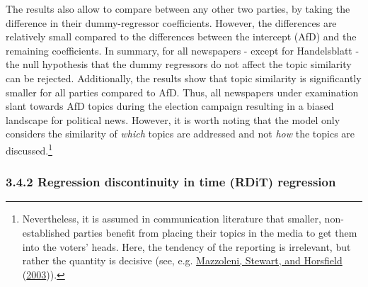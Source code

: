 \documentclass[
  12pt,
]{article}
\begin{document}
The results also allow to compare between any other two parties, by
taking the difference in their dummy-regressor coefficients. However,
the differences are relatively small compared to the differences between
the intercept (AfD) and the remaining coefficients. In summary, for all
newspapers - except for Handelsblatt - the null hypothesis that the
dummy regressors do not affect the topic similarity can be rejected.
Additionally, the results show that topic similarity is significantly
smaller for all parties compared to AfD. Thus, all newspapers under
examination slant towards AfD topics during the election campaign
resulting in a biased landscape for political news. However, it is worth
noting that the model only considers the similarity of \emph{which}
topics are addressed and not \emph{how} the topics are
discussed.\footnote{Nevertheless, it is assumed in communication
  literature that smaller, non-established parties benefit from placing
  their topics in the media to get them into the voters' heads. Here,
  the tendency of the reporting is irrelevant, but rather the quantity
  is decisive (see, e.g.
  \protect\hyperlink{ref-mazzoleni_media_2003}{Mazzoleni, Stewart, and
  Horsfield} (\protect\hyperlink{ref-mazzoleni_media_2003}{2003})).}

\hypertarget{rdit}{%
\subsubsection{3.4.2 Regression discontinuity in time (RDiT)
regression}\label{rdit}}
\end{document}
